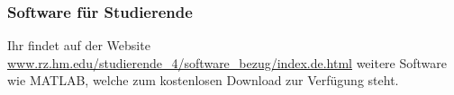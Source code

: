 \subsubsection{Software für Studierende} 
Ihr  findet auf der Website \url{www.rz.hm.edu/studierende_4/software_bezug/index.de.html} weitere Software wie MATLAB, welche zum kostenlosen Download zur Verfügung steht.